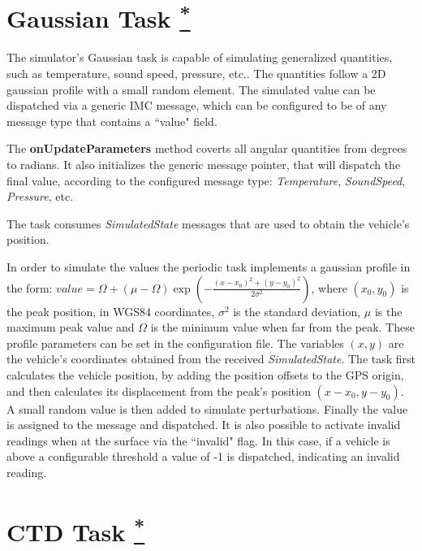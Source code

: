 \documentclass[10pt,a4paper]{article}
\begin{document}
\section{Gaussian Task \href{https://www.lsts.pt/docs/dune/dune-2017.01.0-dmsmw/d9/d36/structSimulators_1_1Gaussian_1_1Task.html}{\textsuperscript{*}}}

\par The simulator's Gaussian task is capable of simulating generalized quantities, such as temperature, sound speed, pressure, etc.. The quantities follow a 2D gaussian profile with a small random element. The simulated value can be dispatched via a generic IMC message, which can be configured to be of any message type that contains a ``value" field.

\par The \textbf{onUpdateParameters} method coverts all angular quantities from degrees to radians.  It also initializes the generic message pointer, that will dispatch the final value, according to the configured message type: \textit{Temperature}, \textit{SoundSpeed}, \textit{Pressure}, etc.

\par The task consumes \textit{SimulatedState} messages that are used to obtain the vehicle's position.

\par In order to simulate the values the periodic task implements a gaussian profile in the form: $value = \Omega +\left(\mu - \Omega\right) \exp\left(-\frac{\left(x - x_0\right)^2+\left(y - y_0\right)^2 }{2\sigma^2}\right)$, where $\left(x_0, y_0\right)$ is the peak position, in WGS84 coordinates, $\sigma^2$ is the standard deviation, $\mu$ is the maximum peak value and $\Omega$ is the minimum value when far from the peak. These profile parameters can be set in the configuration file. The variables $\left(x, y\right)$ are the vehicle's coordinates obtained from the received \textit{SimulatedState}. The task first calculates the vehicle position, by adding the position offsets to the GPS origin, and then calculates its displacement from the peak's position $\left(x-x_0, y-y_0 \right)$. A small random value is then added to simulate perturbations. Finally the value is assigned to the message and dispatched. It is also possible to activate invalid readings when at the surface via the ``invalid" flag. In this case, if a vehicle is above a configurable threshold a value of -1 is dispatched, indicating an invalid reading.

\section{CTD Task \href{https://www.lsts.pt/docs/dune/dune-2017.01.0-dmsmw/dd/df2/structSimulators_1_1CTD_1_1Task.html}{\textsuperscript{*}}}
\end{document}
